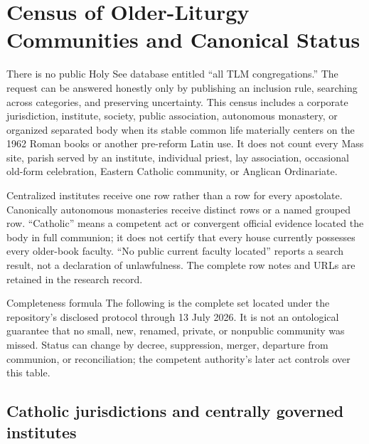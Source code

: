 \section{Census of Older-Liturgy Communities and Canonical Status}

There is no public Holy See database entitled “all TLM congregations.” The request can be answered honestly only by publishing an inclusion rule, searching across categories, and preserving uncertainty. This census includes a corporate jurisdiction, institute, society, public association, autonomous monastery, or organized separated body when its stable common life materially centers on the 1962 Roman books or another pre-reform Latin use. It does not count every Mass site, parish served by an institute, individual priest, lay association, occasional old-form celebration, Eastern Catholic community, or Anglican Ordinariate.

Centralized institutes receive one row rather than a row for every apostolate. Canonically autonomous monasteries receive distinct rows or a named grouped row. “Catholic” means a competent act or convergent official evidence located the body in full communion; it does not certify that every house currently possesses every older-book faculty. “No public current faculty located” reports a search result, not a declaration of unlawfulness. The complete row notes and URLs are retained in the research record.

\begin{studybox}{Completeness formula}
The following is the complete set located under the repository's disclosed protocol through 13 July 2026. It is not an ontological guarantee that no small, new, renamed, private, or nonpublic community was missed. Status can change by decree, suppression, merger, departure from communion, or reconciliation; the competent authority's later act controls over this table.
\end{studybox}

\subsection{Catholic jurisdictions and centrally governed institutes}

